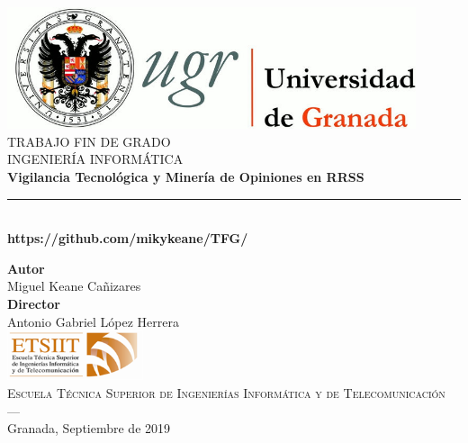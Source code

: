 
 
\newlength{\centeroffset}
\setlength{\centeroffset}{-0.5\oddsidemargin}
\addtolength{\centeroffset}{0.5\evensidemargin}
\thispagestyle{empty}

\noindent\hspace*{\centeroffset}\begin{minipage}{\textwidth}

\centering
\includegraphics[width=0.9\textwidth]{imagenes/logo_ugr.jpg}\\[1.4cm]

\textsc{ \Large TRABAJO FIN DE GRADO\\[0.2cm]}
\textsc{ INGENIERÍA INFORMÁTICA}\\[1cm]
% 
{\Huge\bfseries Vigilancia Tecnológica y Minería de Opiniones en RRSS\\
}
\noindent\rule[-1ex]{\textwidth}{3pt}\\[3.5ex]
{\large\bfseries https://github.com/mikykeane/TFG/}
\end{minipage}

\vspace{2.5cm}
\noindent\hspace*{\centeroffset}\begin{minipage}{\textwidth}
\centering

\textbf{Autor}\\ {Miguel Keane Cañizares }\\[2.5ex]
\textbf{Director}\\
{Antonio Gabriel López Herrera }\\
\includegraphics[width=0.3\textwidth]{imagenes/etsiit_logo.png}\\[0.1cm]
\textsc{Escuela Técnica Superior de Ingenierías Informática y de Telecomunicación}\\
\textsc{---}\\
Granada, Septiembre de 2019
\end{minipage}


